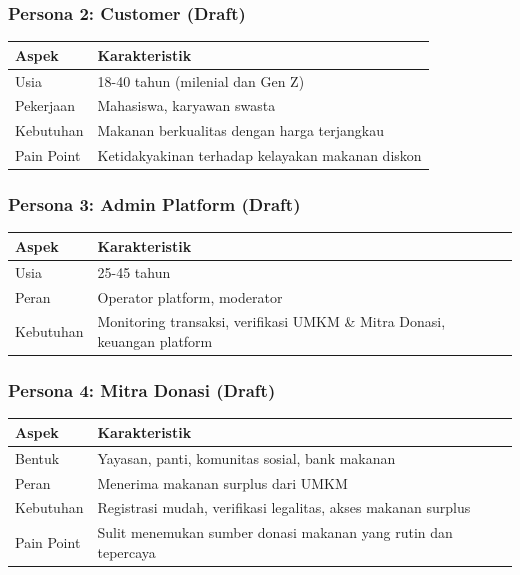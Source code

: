 \subsubsection{Persona 2: Customer (Draft)}
\begin{table}[htbp]
\centering
\begin{tabularx}{0.8\textwidth}{|l|X|}
\hline
\textbf{Aspek} & \textbf{Karakteristik} \\
\hline
Usia & 18-40 tahun (milenial dan Gen Z) \\
\hline
Pekerjaan & Mahasiswa, karyawan swasta \\
\hline
Kebutuhan & Makanan berkualitas dengan harga terjangkau \\
\hline
Pain Point & Ketidakyakinan terhadap kelayakan makanan diskon \\
\hline
\end{tabularx}
\end{table}

\subsubsection{Persona 3: Admin Platform (Draft)}
\begin{table}[htbp]
\centering
\begin{tabularx}{0.8\textwidth}{|l|X|}
\hline
\textbf{Aspek} & \textbf{Karakteristik} \\
\hline
Usia & 25-45 tahun \\
\hline
Peran & Operator platform, moderator \\
\hline
Kebutuhan & Monitoring transaksi, verifikasi UMKM \& Mitra Donasi, keuangan platform \\
\hline
\end{tabularx}
\end{table}

\subsubsection{Persona 4: Mitra Donasi (Draft)}
\begin{table}[htbp]
\centering
\begin{tabularx}{0.8\textwidth}{|l|X|}
\hline
\textbf{Aspek} & \textbf{Karakteristik} \\
\hline
Bentuk & Yayasan, panti, komunitas sosial, bank makanan \\
\hline
Peran & Menerima makanan surplus dari UMKM \\
\hline
Kebutuhan & Registrasi mudah, verifikasi legalitas, akses makanan surplus \\
\hline
Pain Point & Sulit menemukan sumber donasi makanan yang rutin dan tepercaya \\
\hline
\end{tabularx}
\end{table}

